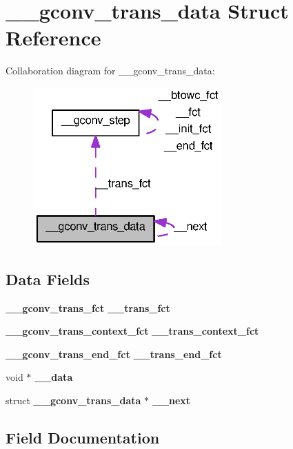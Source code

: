 \section{\_\-\_\-gconv\_\-trans\_\-data Struct Reference}
\label{struct____gconv__trans__data}


Collaboration diagram for \_\-\_\-gconv\_\-trans\_\-data:
\nopagebreak
\begin{figure}[H]
\begin{center}
\leavevmode
\includegraphics[width=205pt]{struct____gconv__trans__data__coll__graph}
\end{center}
\end{figure}
\subsection*{Data Fields}
\begin{DoxyCompactItemize}
\item 
{\bf \_\-\_\-gconv\_\-trans\_\-fct} {\bf \_\-\_\-trans\_\-fct}
\item 
{\bf \_\-\_\-gconv\_\-trans\_\-context\_\-fct} {\bf \_\-\_\-trans\_\-context\_\-fct}
\item 
{\bf \_\-\_\-gconv\_\-trans\_\-end\_\-fct} {\bf \_\-\_\-trans\_\-end\_\-fct}
\item 
void $\ast$ {\bf \_\-\_\-data}
\item 
struct {\bf \_\-\_\-gconv\_\-trans\_\-data} $\ast$ {\bf \_\-\_\-next}
\end{DoxyCompactItemize}


\subsection{Field Documentation}
